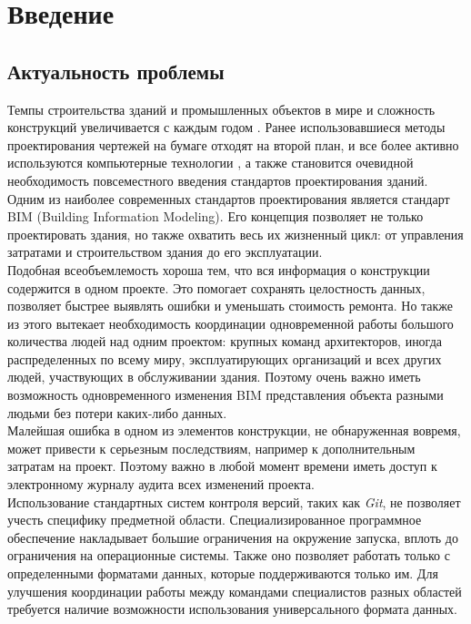 \documentclass[a4paper,14pt]{extreport} %
\begin{document}
\tableofcontents %

\newpage
\chapter{Введение}
\section{Актуальность проблемы}

Темпы строительства зданий и промышленных объектов в мире и сложность конструкций увеличивается с каждым годом \cite{BUILDING_GROWTH_RATE}. Ранее использовавшиеся методы проектирования чертежей на бумаге отходят на второй план, и все более активно используются компьютерные технологии \cite{BUILDING_SOFTWARE}, а также становится очевидной необходимость повсеместного введения стандартов проектирования зданий. \\
Одним из наиболее современных стандартов проектирования является стандарт BIM (Building Information Modeling)\cite{BIM_FUTURE}. Его концепция позволяет не только проектировать здания, но также охватить весь их жизненный цикл: от управления затратами и строительством здания до его эксплуатации. \\
Подобная всеобъемлемость хороша тем, что вся информация о конструкции содержится в одном проекте. Это помогает сохранять целостность данных, позволяет быстрее выявлять ошибки и уменьшать стоимость ремонта. Но также из этого вытекает необходимость координации одновременной работы большого количества людей над одним проектом: крупных команд архитекторов, иногда распределенных по всему миру, эксплуатирующих организаций и всех других людей, участвующих в обслуживании здания. Поэтому очень важно иметь возможность одновременного изменения BIM представления объекта разными людьми без потери каких-либо данных. \\
Малейшая ошибка в одном из элементов конструкции, не обнаруженная вовремя, может привести к серьезным последствиям, например к дополнительным затратам на проект. Поэтому важно в любой момент времени иметь доступ к электронному журналу аудита всех изменений проекта. \\
Использование стандартных систем контроля версий, таких как \textit{Git}, не позволяет учесть специфику предметной области. Специализированное программное обеспечение накладывает большие ограничения на окружение запуска, вплоть до ограничения на операционные системы. Также оно позволяет работать только с определенными форматами данных, которые поддерживаются только им. Для улучшения координации работы между командами специалистов разных областей требуется наличие возможности использования универсального формата данных.
\end{document}
